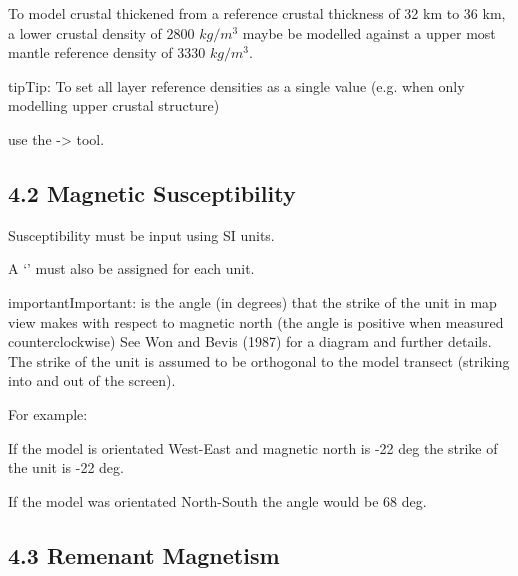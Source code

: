 \documentclass[a4paper,12pt,english]{sphinxmanual}
\begin{document}
To model crustal thickened from a reference crustal thickness of 32 km to 36 km, a lower crustal density of
2800 \(kg/m^3\) maybe be modelled against a upper most mantle reference density of 3330 \(kg/m^3\).

\begin{sphinxadmonition}{tip}{Tip:}
To set all layer reference densities as a single value (e.g. when only modelling upper crustal structure)
\end{sphinxadmonition}

use the  -\textgreater{}  tool.


\subsection{4.2 Magnetic Susceptibility}
\label{\detokenize{manual__layer_attributes:magnetic-susceptibility}}
Susceptibility must be input using SI units.

A ‘’ must also be assigned for each unit.

\begin{sphinxadmonition}{important}{Important:}
 is the angle (in degrees) that the strike of the unit in map view makes with respect to magnetic north
(the angle is positive when measured counterclockwise) See Won and Bevis (1987) for a diagram and further details.
The strike of the unit is assumed to be orthogonal to the model transect (striking into and out of the screen).

For example:

If the model is orientated West-East and magnetic north is -22 deg the strike of the unit is -22 deg.

If the model was orientated North-South the angle would be 68 deg.
\end{sphinxadmonition}


\subsection{4.3 Remenant Magnetism}
\label{\detokenize{manual__layer_attributes:remenant-magnetism}}

\section{}
\label{\detokenize{manual__segy:segy-data}}\label{\detokenize{manual__segy::doc}}
\end{document}
